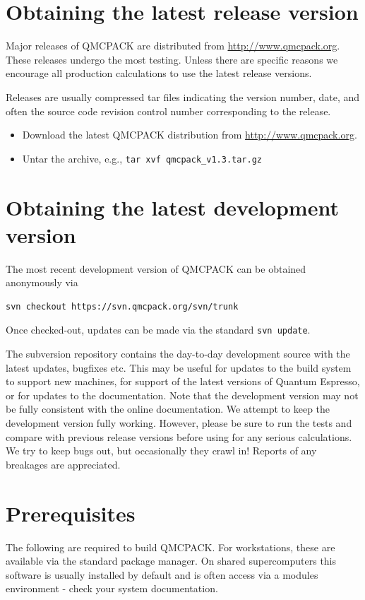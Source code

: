 \section{Obtaining the latest release version}
\label{sec:obrelease} 
Major releases of QMCPACK are distributed from
\url{http://www.qmcpack.org}. These releases undergo the most testing. Unless there are
specific reasons we encourage all production calculations to use the
latest release versions.

Releases are usually compressed tar files indicating the version
number, date, and often the source code revision control number
corresponding to the release.

\begin{itemize}
\item Download the latest QMCPACK distribution from \url{http://www.qmcpack.org}.
\item Untar the archive, e.g., \texttt{tar xvf qmcpack\_v1.3.tar.gz}
\end{itemize}

\section{Obtaining the latest development version}
\label{sec:obdevelopment}
The most recent development version of QMCPACK can be obtained anonymously via 
\begin{verbatim}
svn checkout https://svn.qmcpack.org/svn/trunk 
\end{verbatim}
Once checked-out,
updates can be made via the standard \texttt{svn update}.

The subversion repository contains the day-to-day development source
with the latest updates, bugfixes etc. This may be useful
for updates to the build system to support new machines, for support
of the latest versions of Quantum Espresso, or for updates to the
documentation.  Note that the development version may not be fully
consistent with the online documentation.  We attempt to keep
the development version fully working. However, please be sure to run the tests and
compare with previous release versions before using for any serious
calculations. We try to keep bugs out, but occasionally they crawl
in! Reports of any breakages are appreciated.

\section{Prerequisites}
\label{sec:prerequisites}
The following are required to build QMCPACK. For workstations, these are available via the standard
package manager. On shared supercomputers this software is usually
installed by default and is often
access via a modules environment - check your system
documentation.

